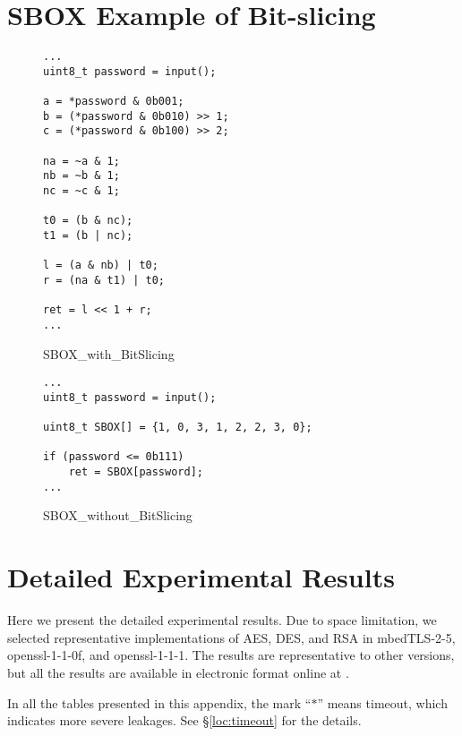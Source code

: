 \clearpage
\section{SBOX Example of Bit-slicing}
\label{appendix:SBOX}

\begin{figure}[h]
      \centering
      \begin{lstlisting}[xleftmargin=.02\textwidth,xrightmargin=.01\textwidth]
...
uint8_t password = input();

a = *password & 0b001;
b = (*password & 0b010) >> 1;
c = (*password & 0b100) >> 2;

na = ~a & 1;
nb = ~b & 1;
nc = ~c & 1;

t0 = (b & nc);
t1 = (b | nc);

l = (a & nb) | t0;
r = (na & t1) | t0;

ret = l << 1 + r;
...
      \end{lstlisting}
      \caption{SBOX\_with\_BitSlicing}
      \label{fig:SBOX_bitslicing}
\end{figure}

\begin{figure}[h]
      \centering
      \begin{lstlisting}[xleftmargin=.02\textwidth,xrightmargin=.01\textwidth]
...
uint8_t password = input();

uint8_t SBOX[] = {1, 0, 3, 1, 2, 2, 3, 0};

if (password <= 0b111)
    ret = SBOX[password];
...
      \end{lstlisting}
      \caption{SBOX\_without\_BitSlicing}
      \label{fig:SBOX_da}
\end{figure}

\section{Detailed Experimental Results}
\label{sec:result-table}

Here we present the detailed experimental results.
Due to space limitation, we selected representative implementations of
AES, DES, and RSA in
mbedTLS-2-5, 
openssl-1-1-0f,  and
openssl-1-1-1.  
The results are representative to other versions, but all the results
are available in electronic format online at .

In all the tables presented in this appendix, the mark
``$*$'' means timeout, which indicates more severe leakages.
See \S\ref{loc:timeout} for the details.

